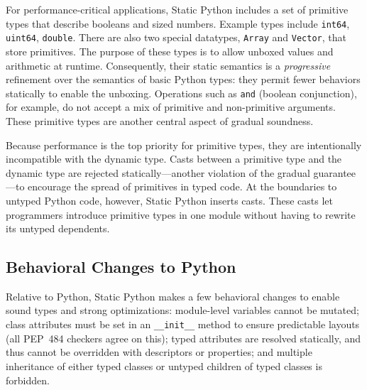 \documentclass[english,cleveref,crc]{programming}
\newcommand{\SP}{Static Python}
\newcommand{\PEP}{PEP~484}
\newcommand{\code}[1]{\texttt{#1}}
\begin{document}

For performance-critical applications, \SP{} includes a set of primitive types
that describe booleans and sized numbers.
Example types include \code{int64}, \code{uint64}, \code{double}.
There are also two special datatypes, \code{Array} and \code{Vector}, that store primitives.
The purpose of these types is to allow unboxed values and arithmetic at
runtime.
Consequently, their static semantics is a \emph{progressive}~\cite{pqk-onward-2012}
refinement over the semantics of basic Python types:
they permit fewer behaviors statically to enable the unboxing.
Operations such as \code{and} (boolean conjunction), for example, do not accept
a mix of primitive and non-primitive arguments.
These primitive types are another central aspect of gradual soundness.

Because performance is the top priority for primitive types, they
are intentionally incompatible with the dynamic type.
Casts between a primitive type and the dynamic type are rejected
statically---another violation of the gradual guarantee---to encourage the
spread of primitives in typed code.
At the boundaries to untyped Python code, however, \SP{} inserts casts.
These casts let programmers introduce primitive types in one module
without having to rewrite its untyped dependents.





\subsection{Behavioral Changes to Python}
\label{s:not-python}

Relative to Python, \SP{} makes a few behavioral changes to enable
sound types and strong optimizations:
module-level variables cannot be mutated;
class attributes must be set in an \code{\_\_init\_\_} method to
ensure predictable layouts (all \PEP{} checkers agree on this);
typed attributes are resolved statically, and thus cannot be overridden with
descriptors or properties;
and
multiple inheritance of either typed classes or untyped children
of typed classes is forbidden.
\end{document}
